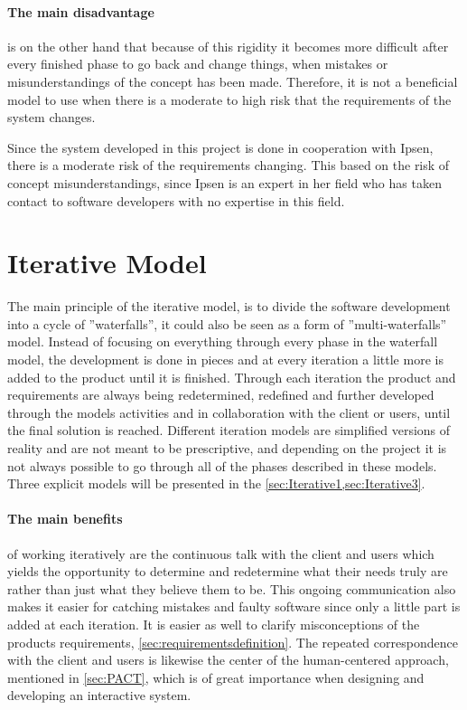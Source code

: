 \paragraph{The main disadvantage} is on the other hand that because of this rigidity it becomes more difficult after every finished phase to go back and change things, when mistakes or misunderstandings of the concept has been made.
Therefore, it is not a beneficial model to use when there is a moderate to high risk that the requirements of the system changes.

Since the system developed in this project is done in cooperation with Ipsen, there is a moderate risk of the requirements changing.
This based on the risk of concept misunderstandings, since Ipsen is an expert in her field who has taken contact to software developers with no expertise in this field.

\section{Iterative Model} \label{sec:iterativModel}
The main principle of the iterative model, \cite{Iterative-Toolsqa,InteractionDesign} is to divide the software development into a cycle of ''waterfalls'', it could also be seen as a form of ''multi-waterfalls'' model.
Instead of focusing on everything through every phase in the waterfall model, the development is done in pieces and at every iteration a little more is added to the product until it is finished.
Through each iteration the product and requirements are always being redetermined, redefined and further developed through the models activities and in collaboration with the client or users, until the final solution is reached.
Different iteration models are simplified versions of reality and are not meant to be prescriptive, and depending on the project it is not always possible to go through all of the phases described in these models.
Three explicit models will be presented in the \cref{sec:Iterative1,sec:Iterative3}.


\paragraph{The main benefits}
of working iteratively are the continuous talk with the client and users which yields the opportunity to determine and redetermine what their needs truly are rather than just what they believe them to be.
This ongoing communication also makes it easier for catching mistakes and faulty software since only a little part is added at each iteration.
It is easier as well to clarify misconceptions of the products requirements, \cref{sec:requirementsdefinition}.
The repeated correspondence with the client and users is likewise the center of the human-centered approach, mentioned in \cref{sec:PACT}, which is of great importance when designing and developing an interactive system.

